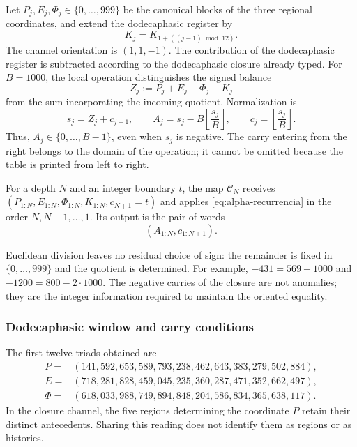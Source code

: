 Let \(P_j,E_j,\Phi_j\in\{0,\ldots,999\}\) be the canonical blocks of
the three regional coordinates, and extend the dodecaphasic register by
\[
 K_j=K_{1+((j-1)\bmod12)}.
\]
The channel orientation is \((1,1,-1)\). The contribution of the dodecaphasic register is
subtracted according to the dodecaphasic closure already typed. For \(B=1000\), the
local operation distinguishes the signed balance
\[
 Z_j:=P_j+E_j-\Phi_j-K_j
\]
from the sum incorporating the incoming quotient. Normalization is
\begin{equation}
 s_j=Z_j+c_{j+1},\qquad
 A_j=s_j-B\left\lfloor\frac{s_j}{B}\right\rfloor,
 \qquad c_j=\left\lfloor\frac{s_j}{B}\right\rfloor.
 \label{eq:alpha-recurrencia}
\end{equation}
Thus, \(A_j\in\{0,\ldots,B-1\}\), even when \(s_j\) is
negative. The carry entering from the right belongs to the domain of
the operation; it cannot be omitted because the table is printed from left
to right.

\begin{definition}
\label{def:alpha-finita}
For a depth \(N\) and an integer boundary \(t\), the map
\(\mathcal C_N\) receives
\((P_{1:N},E_{1:N},\Phi_{1:N},K_{1:N},c_{N+1}=t)\) and applies
\eqref{eq:alpha-recurrencia} in the order \(N,N-1,\ldots,1\). Its output
is the pair of words
\[
 (A_{1:N},c_{1:N+1}).
\]
\end{definition}

Euclidean division leaves no residual choice of sign: the remainder is
fixed in \(\{0,\ldots,999\}\) and the quotient is determined. For
example, \(-431=569-1000\) and \(-1200=800-2\cdot1000\). The
negative carries of the closure are not anomalies; they are the integer
information required to maintain the oriented equality.

\subsubsection{Dodecaphasic window and carry conditions}
\label{subsec:alpha-ventana}

The first twelve triads obtained are
\begin{align*}
 P={}&(141,592,653,589,793,238,462,643,383,279,502,884),\\
 E={}&(718,281,828,459,045,235,360,287,471,352,662,497),\\
 \Phi={}&(618,033,988,749,894,848,204,586,834,365,638,117).
\end{align*}
In the closure channel, the five regions determining the coordinate
\(P\) retain their distinct antecedents. Sharing this reading does not
identify them as regions or as histories.

